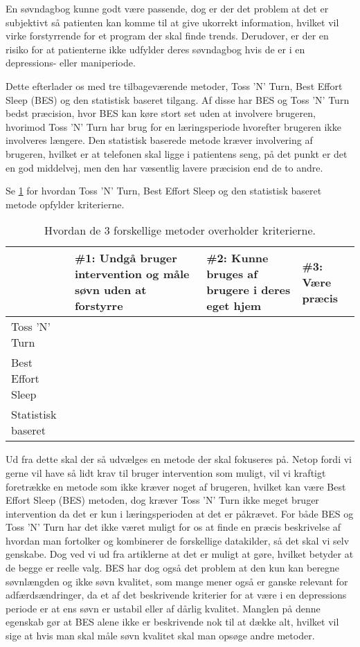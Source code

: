 En søvndagbog kunne godt være passende, dog er der det problem at det er subjektivt så patienten kan komme til at give ukorrekt information, hvilket vil virke forstyrrende for et program der skal finde trends.
Derudover, er der en risiko for at patienterne ikke udfylder deres søvndagbog hvis de er i en depressions- eller maniperiode.

Dette efterlader os med tre tilbageværende metoder, Toss 'N' Turn, Best Effort Sleep (BES) og den statistisk baseret tilgang.
Af disse har BES og Toss 'N' Turn bedst præcision, hvor BES kan køre stort set uden at involvere brugeren, hvorimod Toss 'N' Turn har brug for en læringsperiode hvorefter brugeren ikke involveres længere.
Den statistisk baserede metode kræver involvering af brugeren, hvilket er at telefonen skal ligge i patientens seng, på det punkt er det en god middelvej, men den har væsentlig lavere præcision end de to andre.

Se \cref{tab:soevnMetodeKriterier} for hvordan Toss 'N' Turn, Best Effort Sleep og den statistisk baseret metode opfylder kriterierne.

\begin{table}
\begin{tabular}{|p{4cm}|p{3cm}|p{3cm}|p{3cm}|}
	\hline  ~ & \#1: Undgå bruger intervention og måle søvn uden at forstyrre & \#2: Kunne bruges af brugere i deres eget hjem & \#3: Være præcis \\ 
	\hline Toss 'N' Turn &  & \checkmark & \checkmark \\ 
	\hline Best Effort Sleep & \checkmark & \checkmark & \checkmark \\ 
	\hline Statistisk baseret &  & \checkmark &  \\ 
	\hline 
\end{tabular}
\caption{Hvordan de 3 forskellige metoder overholder kriterierne.}
\label{tab:soevnMetodeKriterier}
\end{table}

Ud fra dette skal der så udvælges en metode der skal fokuseres på. 
Netop fordi vi gerne vil have så lidt krav til bruger intervention som muligt, vil vi kraftigt foretrække en metode som ikke kræver noget af brugeren, hvilket kan være Best Effort Sleep (BES) metoden, dog kræver Toss 'N' Turn ikke meget bruger intervention da det er kun i læringsperioden at det er påkrævet.
For både BES og Toss 'N' Turn har det ikke været muligt for os at finde en præcis beskrivelse af hvordan man fortolker og kombinerer de forskellige datakilder, så det skal vi selv genskabe.
Dog ved vi ud fra artiklerne at det er muligt at gøre, hvilket betyder at de begge er reelle valg. 
BES har dog også det problem at den kun kan beregne søvnlængden og ikke søvn kvalitet, som mange mener også er ganske relevant for adfærdsændringer, da et af det beskrivende kriterier for at være i en depressions periode er at ens søvn er ustabil eller af dårlig kvalitet. 
Manglen på denne egenskab gør at BES alene ikke er beskrivende nok til at dække alt, hvilket vil sige at hvis man skal måle søvn kvalitet skal man opsøge andre metoder.

